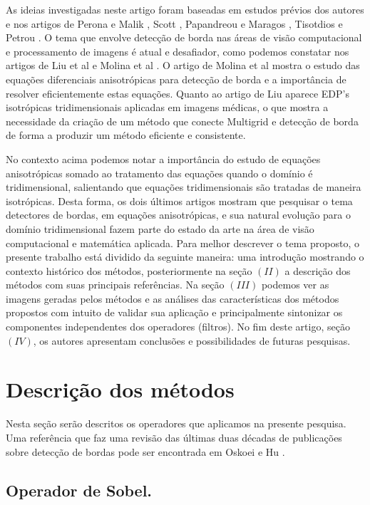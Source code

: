 \documentclass[a4paper]{article} %
\begin{document}
As ideias investigadas neste artigo foram baseadas em estudos prévios dos autores e nos artigos de Perona e Malik \cite{perona1990scale}, Scott \cite{scott1998multigrid}, Papandreou e Maragos \cite{papandreou2007multigrid}, Tisotdios e Petrou \cite{tsiotsios2013anisotropic}. O tema que envolve detecção de borda nas áreas de visão computacional e processamento de imagens é atual e desafiador, como podemos constatar nos artigos de Liu et al \cite{liu2017multigrid} e  Molina et al \cite{molina2014impact}. O artigo de Molina et al \cite{molina2014impact} mostra o estudo das equações diferenciais anisotrópicas para detecção de borda e a importância de resolver eficientemente estas equações. Quanto ao artigo de Liu\cite{liu2017multigrid} aparece EDP's isotrópicas tridimensionais aplicadas em imagens médicas, o que mostra a necessidade da criação de um método que conecte Multigrid  e detecção de borda de forma a produzir um método eficiente e consistente.

No contexto acima podemos notar a importância do estudo de equações anisotrópicas somado ao tratamento das equações quando o domínio é tridimensional, salientando que equações tridimensionais são tratadas de maneira isotrópicas. Desta forma, os dois últimos artigos mostram que pesquisar o tema detectores de bordas, em equações anisotrópicas, e sua natural evolução para o domínio tridimensional fazem parte do estado da arte na área de visão computacional e matemática aplicada.   
Para melhor descrever o tema proposto, o presente trabalho está dividido da seguinte maneira: uma introdução mostrando o contexto histórico dos métodos, posteriormente na seção $(II)$ a descrição dos métodos com suas principais referências. Na seção $(III)$ podemos ver as imagens geradas pelos métodos e as análises das características dos métodos propostos com intuito de validar sua aplicação e principalmente sintonizar os componentes independentes dos operadores (filtros). No fim deste artigo, seção $(IV)$, os autores apresentam conclusões e possibilidades de futuras pesquisas. 

\section{Descrição dos métodos}
Nesta seção serão descritos os operadores que aplicamos na presente pesquisa. Uma referência que faz uma revisão das últimas duas décadas de publicações sobre detecção de bordas pode ser encontrada em Oskoei e Hu \cite{oskoei2010survey}.
\subsection{Operador de Sobel.}
\end{document}
